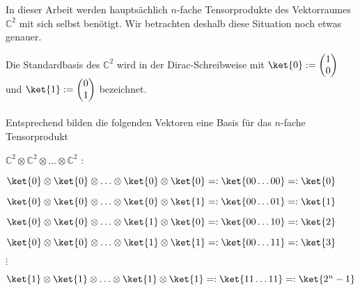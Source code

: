 \vspace{0.3cm}
\noindent In dieser Arbeit werden hauptsächlich $n$-fache Tensorprodukte des Vektorraumes $\mathbb{C}^2$ mit sich selbst benötigt. Wir betrachten deshalb diese Situation noch etwas genauer.

\noindent Die Standardbasis des $\mathbb{C}^2$ wird in der Dirac-Schreibweise mit $\ket{0}:= \begin{pmatrix}1 \\ 0\end{pmatrix}$ und $\ket{1}:= \begin{pmatrix}0 \\ 1\end{pmatrix}$ bezeichnet.

\paragraph{}

\noindent Entsprechend bilden die folgenden Vektoren eine Basis  für das $n$-fache Tensorprodukt 

\hspace{5.5cm}$\mathbb{C}^2\otimes \mathbb{C}^2\otimes\ldots \otimes \mathbb{C}^2$ :


\vspace{0.2cm}
\hspace{3.5cm}\begin{minipage}[t]{10cm}

$\ket{0}\otimes\ket{0}\otimes\ldots\otimes\ket{0}\otimes\ket{0}=:\ket{00\ldots 00}=:\ket{0}$

\vspace{0.2cm}
$\ket{0}\otimes\ket{0}\otimes\ldots\otimes\ket{0}\otimes\ket{1}=:\ket{00\ldots 01}=:\ket{1}$

\vspace{0.2cm}
$\ket{0}\otimes\ket{0}\otimes\ldots\otimes\ket{1}\otimes\ket{0}=:\ket{00\ldots 10}=:\ket{2}$

\vspace{0.2cm}
$\ket{0}\otimes\ket{0}\otimes\ldots\otimes\ket{1}\otimes\ket{1}=:\ket{00\ldots 11}=:\ket{3}$

\vspace{0.1cm}
\hspace{4cm}$\vdots$

\vspace{0.1cm}
$\ket{1}\otimes\ket{1}\otimes\ldots\otimes\ket{1}\otimes\ket{1}=:\ket{11\ldots 11}=:\ket{2^n-1}$

\end{minipage}


